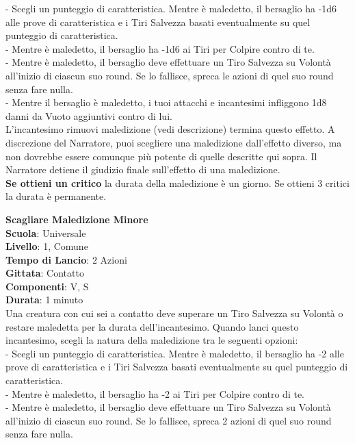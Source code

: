 \begin{multicols}{2}
- Scegli un punteggio di caratteristica. Mentre è maledetto, il bersaglio ha -1d6 alle prove di caratteristica e i Tiri Salvezza basati eventualmente su quel punteggio di caratteristica.\\
- Mentre è maledetto, il bersaglio ha -1d6 ai Tiri per Colpire contro di te.\\
- Mentre è maledetto, il bersaglio deve effettuare un Tiro Salvezza su Volontà all'inizio di ciascun suo round. Se lo fallisce, spreca le azioni di quel suo round senza fare nulla.\\
- Mentre il bersaglio è maledetto, i tuoi attacchi e incantesimi infliggono 1d8 danni da Vuoto aggiuntivi contro di lui.\\

L'incantesimo rimuovi maledizione (vedi descrizione) termina questo effetto. A discrezione del Narratore, puoi scegliere una maledizione dall'effetto diverso, ma non dovrebbe essere comunque più potente di quelle descritte qui sopra. Il Narratore detiene il giudizio finale sull'effetto di una maledizione.\\
\textbf{Se ottieni un critico} la durata della maledizione è un giorno. Se ottieni 3 critici la durata è permanente.

\medskip\textbf{Scagliare Maledizione Minore}\\
\textbf{Scuola}: Universale\\
\textbf{Livello}: 1, Comune\\
\textbf{Tempo di Lancio}: 2 Azioni\\
\textbf{Gittata}: Contatto\\
\textbf{Componenti}: V, S\\
\textbf{Durata}: 1 minuto\\
Una creatura con cui sei a contatto deve superare un Tiro Salvezza su Volontà o restare maledetta per la durata dell'incantesimo. Quando lanci questo incantesimo, scegli la natura della maledizione tra le seguenti opzioni:\\

- Scegli un punteggio di caratteristica. Mentre è maledetto, il bersaglio ha -2 alle prove di caratteristica e i Tiri Salvezza basati eventualmente su quel punteggio di caratteristica.\\
- Mentre è maledetto, il bersaglio ha -2 ai Tiri per Colpire contro di te.\\
- Mentre è maledetto, il bersaglio deve effettuare un Tiro Salvezza su Volontà all'inizio di ciascun suo round. Se lo fallisce, spreca 2 azioni di quel suo round senza fare nulla.\\


\end{multicols}
